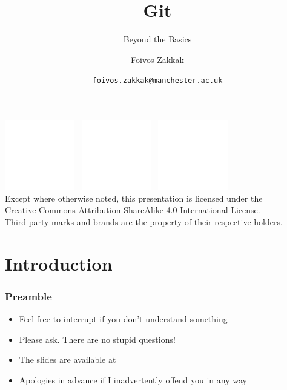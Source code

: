 \documentclass[
14pt,
aspectratio=169,
usenames,
dvipsnames,
x11names]{beamer}
\title[Git: Beyond the Basics]{Git}
\subtitle{Beyond the Basics}
\author[\texttt{foivos.zakkak@manchester.ac.uk}]{Foivos Zakkak}
\date{\texttt{foivos.zakkak@manchester.ac.uk}}
\begin{document}


\begin{frame}[plain]
  \titlepage
  \centering
  \includegraphics[height=.75cm]{cc}~
  \includegraphics[height=.75cm]{by}~
  \includegraphics[height=.75cm]{sa}\\[1em]
  \scriptsize{Except where otherwise noted, this presentation is licensed under the\\
    \href{http://creativecommons.org/licenses/by-nc-sa/4.0/}%
    {Creative Commons Attribution-ShareAlike 4.0 International License.}\\[1ex]
    Third party marks and brands are the property of their respective
    holders.}
\end{frame}


\section{Introduction}

\begin{frame}
  \frametitle{Preamble}
  \begin{itemize} \setlength{\itemsep}{\fill}
  \item Feel free to \alert{interrupt} if you don't understand something
  \item Please ask. \alert{There are no stupid questions}!
  \item The slides are available at 
  \item %
    Apologies in advance if I \alert{inadvertently} offend you in any way
  \end{itemize}
\end{frame}
\end{document}

